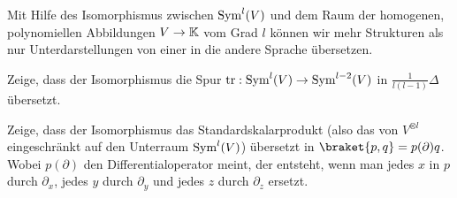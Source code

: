 \begin{sheet}
\begin{problem}[title={Isomorphismus zwischen irreduziblen Darstellungen von Polynomen und Tensoren II}]
Mit Hilfe des Isomorphismus zwischen $\operatorname{Sym}^l(V)$ und dem Raum der homogenen, polynomiellen Abbildungen $V\to\mathbb{K}$ vom Grad $l$ können wir mehr Strukturen als nur Unterdarstellungen von einer in die andere Sprache übersetzen.
\begin{subproblem}
Zeige, dass der Isomorphismus die Spur $\operatorname{tr}: \operatorname{Sym}^l(V) \to \operatorname{Sym}^{l-2}(V)$ in $\frac{1}{l(l-1)}\Delta$ übersetzt.
\end{subproblem}
\begin{subproblem}
Zeige, dass der Isomorphismus das Standardskalarprodukt (also das von $V^{\otimes l}$ eingeschränkt auf den Unterraum $\operatorname{Sym}^l(V)$) übersetzt in $\braket{p,q} = p(\partial)q$. Wobei $p(\partial)$ den Differentialoperator meint, der entsteht, wenn man jedes $x$ in $p$ durch $\partial_x$, jedes $y$ durch $\partial_y$ und jedes $z$ durch $\partial_z$ ersetzt.
\end{subproblem}
\end{problem}

\end{sheet}